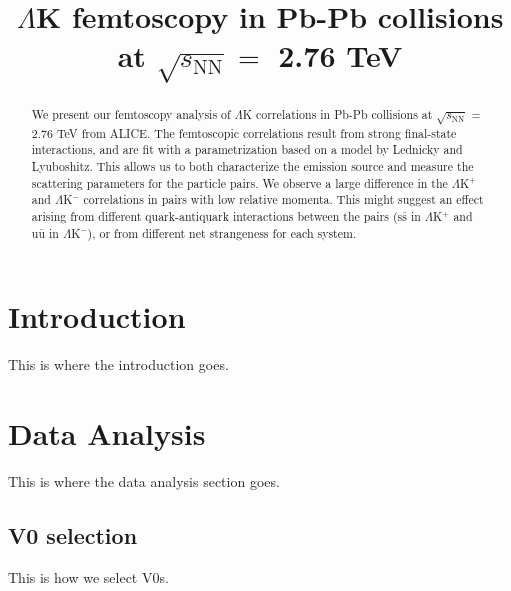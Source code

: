 \documentclass[ALICE,manyauthors]{cernphprep}
\begin{document}
%

\begin{titlepage}
%
%

\title{$\Lambda$K femtoscopy in Pb-Pb collisions at $\sqrt{s_{\mathrm{NN}}} = $ 2.76 TeV}


\begin{abstract}
We present our femtoscopy analysis of $\Lambda$K correlations in Pb-Pb collisions at $\sqrt{s_{\mathrm{NN}}}$ = 2.76 TeV from ALICE.  The femtoscopic correlations result from strong final-state interactions, and are fit with a parametrization based on a model by Lednicky and Lyuboshitz.  This allows us to both characterize the emission source and measure the scattering parameters for the particle pairs.  We observe a large difference in the $\Lambda$K$^{+}$ and $\Lambda$K$^{-}$ correlations in pairs with low relative momenta.  This might suggest an effect arising from different quark-antiquark interactions between the pairs ($\mathrm{s}\bar{\mathrm{s}}$ in $\Lambda$K$^{+}$ and $\mathrm{u}\bar{\mathrm{u}}$ in $\Lambda$K$^{-}$), or from different net strangeness for each system.
\end{abstract}
\end{titlepage}
\setcounter{page}{2}

\section{Introduction}
\label{sec:Introduction}
This is where the introduction goes.

\section{Data Analysis}
\label{sec:DataAnalysis}
This is where the data analysis section goes.

\subsection{V0 selection}
\label{sec:V0Selection}
This is how we select V0s.
\end{document}
